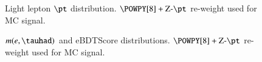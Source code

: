 \begin{figure}[h!tbp]
	\centering
	\hfill
	\caption{Light lepton $\pt$ distribution. $\POWPY[8]+\text{Z-}\pt$ re-weight used for MC signal.}
	\label{AFig14P}
\end{figure} 

\begin{figure}[h!tbp]
	\centering
	\hfill
	\caption{$m(e,\tauhad)$ and eBDTScore distributions. $\POWPY[8]+\text{Z-}\pt$ re-weight used for MC signal.}
	\label{AFig7P}
\end{figure} 

